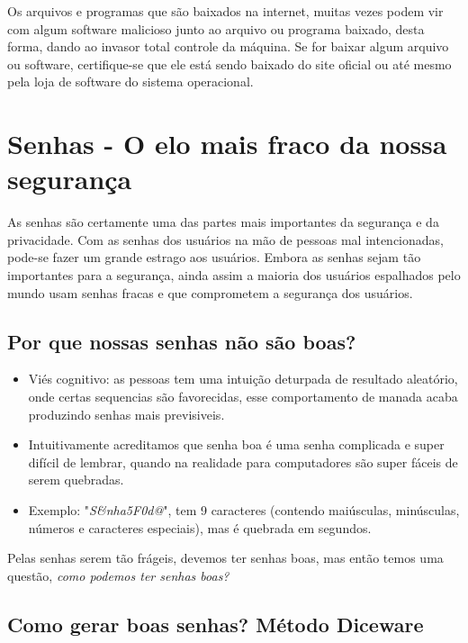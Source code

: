 \documentclass[12pt, letterpaper]{report}
\begin{document}
	Os arquivos e programas que são baixados na internet, muitas vezes podem vir com algum software malicioso junto ao arquivo ou programa baixado, desta forma, dando ao invasor total controle da máquina. Se for baixar algum arquivo ou software, certifique-se que ele está sendo baixado do site oficial ou até mesmo pela loja de software do sistema operacional.\\

\pagebreak

\section*{Senhas - O elo mais fraco da nossa segurança}

As senhas são certamente uma das partes mais importantes da segurança e da privacidade. Com as senhas dos usuários na mão de pessoas mal intencionadas, pode-se fazer um grande estrago aos usuários. Embora as senhas sejam tão importantes para a segurança, ainda assim a maioria dos usuários espalhados pelo mundo usam senhas fracas e que comprometem a segurança dos usuários.\\

\subsection{Por que nossas senhas não são boas?}

\begin{itemize}
	\item Viés cognitivo: as pessoas tem uma intuição deturpada de resultado aleatório, onde certas sequencias são favorecidas, esse comportamento de manada acaba produzindo senhas mais previsiveis.
	\item Intuitivamente acreditamos que senha boa é uma senha complicada e super difícil de lembrar, quando na realidade para computadores são super fáceis de serem quebradas.
	\item Exemplo: "\textit{S\&nha5F0d@}", tem 9 caracteres (contendo maiúsculas, minúsculas, números e caracteres especiais), mas é quebrada em segundos.
\end{itemize}

	Pelas senhas serem tão frágeis, devemos ter senhas boas, mas então temos uma questão, \textit{como podemos ter senhas boas?}\\

\subsection{Como gerar boas senhas? Método Diceware}
\end{document}
